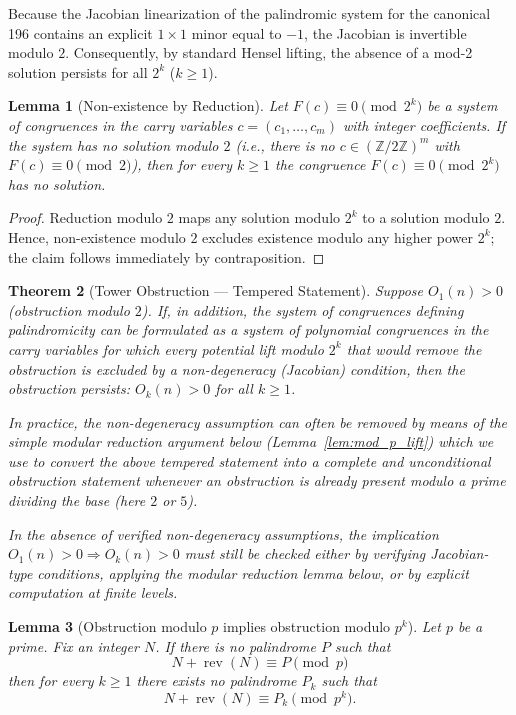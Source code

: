 \documentclass[12pt,a4paper]{article}
\newtheorem{theorem}{Theorem}[section]
\newtheorem{lemma}[theorem]{Lemma}
\begin{document}
Because the Jacobian linearization of the palindromic system for the canonical 196 contains an explicit $1 \times 1$ minor equal to $-1$, the Jacobian is invertible modulo $2$. Consequently, by standard Hensel lifting, the absence of a mod-2 solution persists for all $2^k$ ($k \geq 1$).

\begin{lemma}[Non-existence by Reduction]
Let $F(c) \equiv 0 \pmod{2^k}$ be a system of congruences in the carry variables $c = (c_1, \dots, c_m)$ with integer coefficients. If the system has no solution modulo $2$ (i.e., there is no $c \in (\mathbb{Z}/2\mathbb{Z})^m$ with $F(c) \equiv 0 \pmod{2}$), then for every $k \geq 1$ the congruence $F(c) \equiv 0 \pmod{2^k}$ has no solution.
\end{lemma}

\begin{proof}
Reduction modulo $2$ maps any solution modulo $2^k$ to a solution modulo $2$. Hence, non-existence modulo $2$ excludes existence modulo any higher power $2^k$; the claim follows immediately by contraposition.
\end{proof}

\begin{theorem}[Tower Obstruction — Tempered Statement]%
Suppose $O_1(n) > 0$ (obstruction modulo $2$). If, in addition, the system of congruences defining palindromicity can be formulated as a system of polynomial congruences in the carry variables for which every potential lift modulo $2^k$ that would remove the obstruction is excluded by a non-degeneracy (Jacobian) condition, then the obstruction persists: $O_k(n) > 0$ for all $k \geq 1$.

In practice, the non-degeneracy assumption can often be removed by means of the simple modular reduction argument below (Lemma~\ref{lem:mod_p_lift}) which we use to convert the above tempered statement into a complete and unconditional obstruction statement whenever an obstruction is already present modulo a prime dividing the base (here $2$ or $5$).

In the absence of verified non-degeneracy assumptions, the implication $O_1(n) > 0 \Rightarrow O_k(n) > 0$ must still be checked either by verifying Jacobian-type conditions, applying the modular reduction lemma below, or by explicit computation at finite levels.
\end{theorem}


\begin{lemma}[Obstruction modulo $p$ implies obstruction modulo $p^k$]
Let $p$ be a prime. Fix an integer $N$. If there is no palindrome $P$ such that
$$N+\operatorname{rev}(N)\equiv P\pmod p$$
then for every $k\ge1$ there exists no palindrome $P_k$ such that
$$N+\operatorname{rev}(N)\equiv P_k\pmod{p^k}.$$
\end{lemma}
\end{document}
